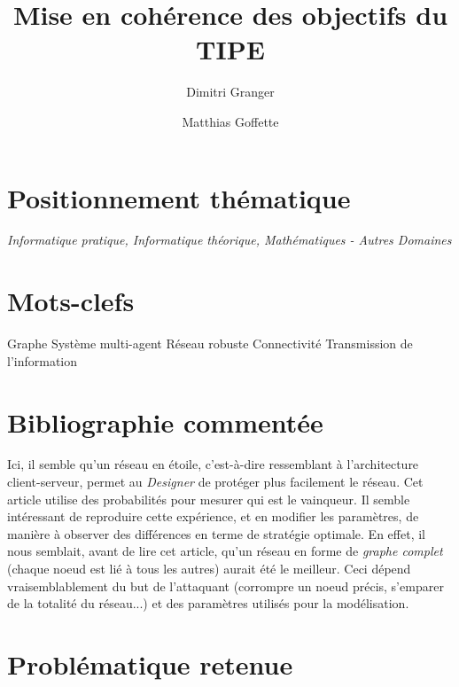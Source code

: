 \documentclass[11pt,a4paper]{article}
\title{Mise en cohérence des objectifs du TIPE}
\author{Dimitri Granger \and Matthias Goffette}
\begin{document}

\maketitle


\section{Positionnement thématique}


%

\emph{Informatique pratique, Informatique théorique, Mathématiques - Autres Domaines}


\section{Mots-clefs}

%
%

\begin{it}
Graphe
Système multi-agent
Réseau robuste
Connectivité
Transmission de l'information
\end{it}


\section{Bibliographie commentée}

		Ici\cite{goyal14}, il semble qu'un réseau en étoile, c'est-à-dire ressemblant à l'architecture client-serveur, permet au \emph{Designer} de protéger plus facilement le réseau. Cet article utilise des probabilités pour mesurer qui est le vainqueur. Il semble intéressant de reproduire cette expérience, et en modifier les paramètres, de manière à observer des différences en terme de stratégie optimale. En effet, il nous semblait, avant de lire cet article, qu'un réseau en forme de \emph{graphe complet} (chaque noeud est lié à tous les autres) aurait été le meilleur. Ceci dépend vraisemblablement du but de l'attaquant (corrompre un noeud précis, s'emparer de la totalité du réseau...) et des paramètres utilisés pour la modélisation.




\section{Problématique retenue}
\end{document}
